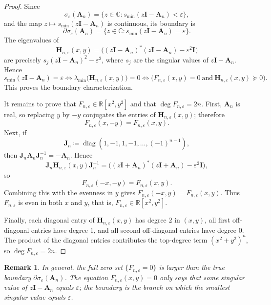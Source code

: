 \documentclass[11pt]{article}
\newtheorem{remark}[theorem]{Remark}
\begin{document}
\begin{proof}
Since
\[
\sigma_\varepsilon(\mathbf{A}_n)
=\{z\in\mathbb{C}\colon s_{\min}(z\mathbf{I}-\mathbf{A}_n)<\varepsilon\},
\]
and the map $z\mapsto s_{\min}(z\mathbf{I}-\mathbf{A}_n)$ is continuous, its boundary is
\[
\partial\sigma_\varepsilon(\mathbf{A}_n)
=\{z\in\mathbb{C}\colon s_{\min}(z\mathbf{I}-\mathbf{A}_n)=\varepsilon\}.
\]
The eigenvalues of
\[
\mathbf{H}_{n,\varepsilon}(x,y)
=\bigl((z\mathbf{I}-\mathbf{A}_n)^*(z\mathbf{I}-\mathbf{A}_n)-\varepsilon^2\mathbf{I}\bigr)
\]
are precisely $s_j(z\mathbf{I}-\mathbf{A}_n)^2-\varepsilon^2$, where $s_j$ are the singular
values of $z\mathbf{I}-\mathbf{A}_n$. Hence
\[
s_{\min}(z\mathbf{I}-\mathbf{A}_n)=\varepsilon
\iff
\lambda_{\min}\bigl(\mathbf{H}_{n,\varepsilon}(x,y)\bigr)=0
\iff
\bigl(F_{n,\varepsilon}(x,y)=0\ \text{and}\ \mathbf{H}_{n,\varepsilon}(x,y)\succeq 0\bigr).
\]
This proves the boundary characterization.

It remains to prove that $F_{n,\varepsilon}\in\mathbb{R}[x^2,y^2]$ and that
$\deg F_{n,\varepsilon}=2n$. First, $\mathbf{A}_n$ is real, so replacing $y$ by $-y$
conjugates the entries of $\mathbf{H}_{n,\varepsilon}(x,y)$; therefore
\[
F_{n,\varepsilon}(x,-y)=F_{n,\varepsilon}(x,y).
\]
Next, if
\[
\mathbf{J}_n\coloneqq \operatorname{diag}(1,-1,1,-1,\dots,(-1)^{n-1}),
\]
then $\mathbf{J}_n\mathbf{A}_n\mathbf{J}_n^{-1}=-\mathbf{A}_n$. Hence
\[
\mathbf{J}_n\mathbf{H}_{n,\varepsilon}(x,y)\mathbf{J}_n^{-1}
=\bigl((z\mathbf{I}+\mathbf{A}_n)^*(z\mathbf{I}+\mathbf{A}_n)-\varepsilon^2\mathbf{I}\bigr),
\]
so
\[
F_{n,\varepsilon}(-x,-y)=F_{n,\varepsilon}(x,y).
\]
Combining this with the evenness in $y$ gives $F_{n,\varepsilon}(-x,y)=F_{n,\varepsilon}(x,y)$.
Thus $F_{n,\varepsilon}$ is even in both $x$ and $y$, that is,
$F_{n,\varepsilon}\in\mathbb{R}[x^2,y^2]$.

Finally, each diagonal entry of $\mathbf{H}_{n,\varepsilon}(x,y)$ has degree $2$ in $(x,y)$,
all first off-diagonal entries have degree $1$, and all second off-diagonal entries have degree $0$.
The product of the diagonal entries contributes the top-degree term
$(x^2+y^2)^n$, so $\deg F_{n,\varepsilon}=2n$.
\end{proof}

\begin{remark}\label{rem:not-exact-algebraic-curve}
In general, the full zero set $\{F_{n,\varepsilon}=0\}$ is larger than the true boundary
$\partial\sigma_\varepsilon(\mathbf{A}_n)$. The equation $F_{n,\varepsilon}(x,y)=0$ only says that
\emph{some} singular value of $z\mathbf{I}-\mathbf{A}_n$ equals $\varepsilon$; the boundary is the
branch on which the \emph{smallest} singular value equals $\varepsilon$.
\end{remark}
\end{document}
